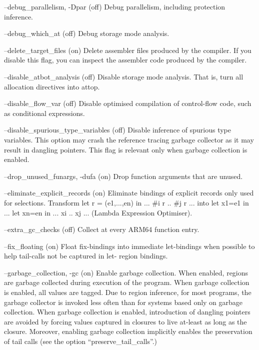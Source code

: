 \documentclass[12pt]{book}
\begin{document}
\begin{scriptcode}
--debug_parallelism, -Dpar                               (off)
     Debug parallelism, including protection inference.

--debug_which_at                                         (off)
     Debug storage mode analysis.

--delete_target_files                                     (on)
     Delete assembler files produced by the compiler. If you
     disable this flag, you can inspect the assembler code
     produced by the compiler.

--disable_atbot_analysis                                 (off)
     Disable storage mode analysis. That is, turn all
     allocation directives into attop.

--disable_flow_var                                       (off)
     Disable optimised compilation of control-flow
     code, such as conditional expressions.

--disable_spurious_type_variables                        (off)
     Disable inference of spurious type variables. This option
     may crash the reference tracing garbage collector as it may
     result in dangling pointers. This flag is relevant only when
     garbage collection is enabled.

--drop_unused_funargs, -dufa                              (on)
     Drop function arguments that are unused.

--eliminate_explicit_records                              (on)
     Eliminate bindings of explicit records only used for
     selections. Transform
           let r = (e1,...,en) in ... #i r .. #j r ...
     into
           let x1=e1 in ... let xn=en in ... xi .. xj ...
     (Lambda Expression Optimiser).

--extra_gc_checks                                        (off)
     Collect at every ARM64 function entry.

--fix_floating                                            (on)
     Float fix-bindings into immediate let-bindings when
     possible to help tail-calls not be captured in let-
     region bindings.

--garbage_collection, -gc                                 (on)
     Enable garbage collection. When enabled, regions are
     garbage collected during execution of the program. When
     garbage collection is enabled, all values are tagged. Due
     to region inference, for most programs, the garbage
     collector is invoked less often than for systems based
     only on garbage collection. When garbage collection is
     enabled, introduction of dangling pointers are avoided by
     forcing values captured in closures to live at-least as
     long as the closure. Moreover, enabling garbage
     collection implicitly enables the preservation of tail
     calls (see the option ``preserve_tail_calls''.)


\end{scriptcode}
\end{document}
